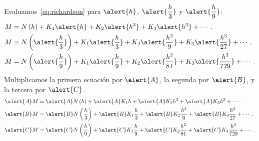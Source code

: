 \begin{frame}
    \begin{solution}
        Evaluamos~\eqref{eq:richardson} para $\alert{h}$,
        $\alert{\dfrac{h}{3}}$ y $\alert{\dfrac{h}{9}}$:
        \begin{align*}
            M & =
            N\left(h\right)+
            K_{1}\alert{h}+
            K_{2}\alert{h^{2}}+
            K_{3}\alert{h^{3}}+
            \cdots.
            \\
            M & =
            N\left(\alert{\dfrac{h}{3}}\right)+
            K_{1}\alert{\dfrac{h}{3}}+
            K_{2}\alert{\dfrac{h^{2}}{9}}+
            K_{3}\alert{\dfrac{h^{3}}{27}}+
            \cdots. \\
            M & =
            N\left(\alert{\dfrac{h}{9}}\right)+
            K_{1}\alert{\dfrac{h}{9}}+
            K_{2}\alert{\dfrac{h^{2}}{81}}+
            K_{3}\alert{\dfrac{h^{3}}{729}}+
            \cdots.
        \end{align*}
        Multiplicamos la primera ecuación por $\alert{A}$, la segunda
        por $\alert{B}$, y la tercera por $\alert{C}$.
        \begin{align*}
            \alert{A}M & =
            \alert{A}N\left(h\right)+
            \alert{A}K_{1}h+
            \alert{A}K_{2}h^{2}+
            \alert{A}K_{3}h^{3}+
            \cdots.
            \\
            \alert{B}M & =
            \alert{B}N\left(\dfrac{h}{3}\right)+
            \alert{B}K_{1}\dfrac{h}{3}+
            \alert{B}K_{2}\dfrac{h^{2}}{9}+
            \alert{B}K_{3}\dfrac{h^{3}}{27}+
            \cdots.        \\
            \alert{C}M & =
            \alert{C}N\left(\dfrac{h}{9}\right)+
            \alert{C}K_{1}\dfrac{h}{9}+
            \alert{C}K_{2}\dfrac{h^{2}}{81}+
            \alert{C}K_{3}\dfrac{h^{3}}{729}+
            \cdots.
        \end{align*}
    \end{solution}
\end{frame}

